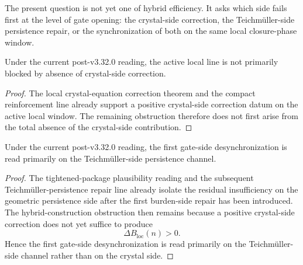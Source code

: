 \begin{remark}
\label{rem:what-first-out-of-sync-means}
The present question is not yet one of hybrid efficiency.
It asks which side fails first at the level of gate opening:
the crystal-side correction, the Teichm\"uller-side persistence repair, or the synchronization of both on the same local closure-phase window.
\end{remark}

\begin{proposition}
\label{prop:current-line-is-not-crystal-obstruction-prior}
Under the current post-v3.32.0 reading, the active local line is not primarily blocked by absence of crystal-side correction.
\end{proposition}

\begin{proof}
The local crystal-equation correction theorem and the compact reinforcement line already support a positive crystal-side correction datum on the active local window.
The remaining obstruction therefore does not first arise from the total absence of the crystal-side contribution.
\end{proof}

\begin{proposition}
\label{prop:current-line-is-teichmueller-side-prior-at-the-gate}
Under the current post-v3.32.0 reading, the first gate-side desynchronization is read primarily on the Teichm\"uller-side persistence channel.
\end{proposition}

\begin{proof}
The tightened-package plausibility reading and the subsequent Teichm\"uller-persistence repair line already isolate the residual insufficiency on the geometric persistence side after the first burden-side repair has been introduced.
The hybrid-construction obstruction then remains because a positive crystal-side correction does not yet suffice to produce
\[
  \Delta B_{\mathrm{loc}}(n)>0.
\]
Hence the first gate-side desynchronization is read primarily on the Teichm\"uller-side channel rather than on the crystal side.
\end{proof}

